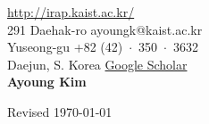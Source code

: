 \documentclass{cv} %
\newcommand\koronly[1]{\ifthenelse{\boolean{kor}}{#1}}
\begin{document}
 \hfill \href{http://irap.kaist.ac.kr/}{http://irap.kaist.ac.kr/}\\
291 Daehak-ro \hfill ayoungk@kaist.ac.kr\\
Yuseong-gu \hfill +82 (42)~$\cdot$~350~$\cdot$~3632\\
Daejun, S. Korea \hfill \href{https://scholar.google.com/citations?user=7yveufgAAAAJ&hl=en}{Google Scholar}\\

\hfil{\namesize\bf Ayoung Kim}\hfil

%





\koronly{}


%
%



%
%



\vspace{0.5in}
\hfill Revised \today
\end{document}
